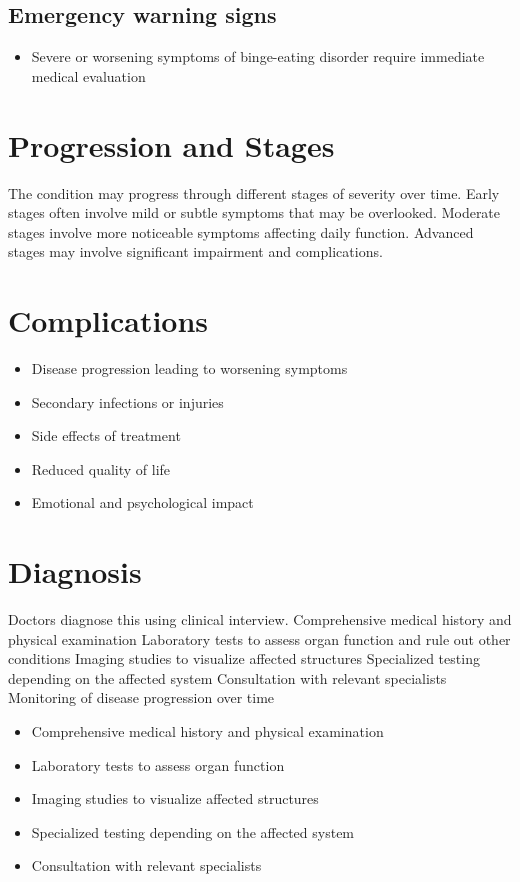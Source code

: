 \subsection{Emergency warning signs}
\begin{itemize}[noitemsep]
  \item Severe or worsening symptoms of binge-eating disorder require immediate medical evaluation
\end{itemize}
\section{Progression and Stages}
The condition may progress through different stages of severity over time. Early stages often involve mild or subtle symptoms that may be overlooked. Moderate stages involve more noticeable symptoms affecting daily function. Advanced stages may involve significant impairment and complications.
\section{Complications}
\begin{itemize}[noitemsep]
  \item Disease progression leading to worsening symptoms
  \item Secondary infections or injuries
  \item Side effects of treatment
  \item Reduced quality of life
  \item Emotional and psychological impact
\end{itemize}
\section{Diagnosis}
Doctors diagnose this using clinical interview. Comprehensive medical history and physical examination Laboratory tests to assess organ function and rule out other conditions Imaging studies to visualize affected structures Specialized testing depending on the affected system Consultation with relevant specialists Monitoring of disease progression over time

\begin{itemize}[noitemsep]
  \item Comprehensive medical history and physical examination
  \item Laboratory tests to assess organ function
  \item Imaging studies to visualize affected structures
  \item Specialized testing depending on the affected system
  \item Consultation with relevant specialists
\end{itemize}
